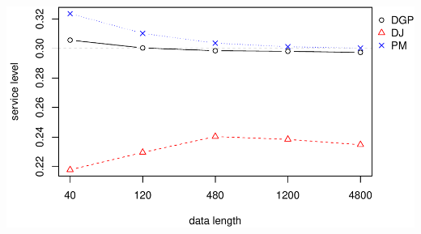 \documentclass[
]{article}
\begin{document}
\includegraphics{runif-plot_files/figure-latex/sl-1.pdf}
\end{document}
